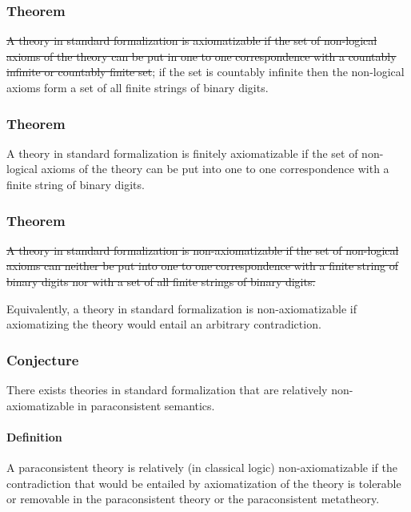 \hypertarget{theorem-9}{%
\subsubsection{Theorem}\label{theorem-9}}

\st{A theory in standard formalization is axiomatizable if the set of
non-logical axioms of the theory can be put in one to one correspondence
with a countably infinite or countably finite set}; if the set is
countably infinite then the non-logical axioms form a set of all finite
strings of binary digits.

\hypertarget{theorem-10}{%
\subsubsection{Theorem}\label{theorem-10}}

A theory in standard formalization is finitely axiomatizable if the set
of non-logical axioms of the theory can be put into one to one
correspondence with a finite string of binary digits.

\hypertarget{theorem-11}{%
\subsubsection{Theorem}\label{theorem-11}}

\st{A theory in standard formalization is non-axiomatizable if the set
of non-logical axioms can neither be put into one to one correspondence
with a finite string of binary digits nor with a set of all finite
strings of binary digits.}

Equivalently, a theory in standard formalization is non-axiomatizable if
axiomatizing the theory would entail an arbitrary contradiction.

\hypertarget{conjecture-2}{%
\subsubsection{Conjecture}\label{conjecture-2}}

There exists theories in standard formalization that are relatively
non-axiomatizable in paraconsistent semantics.

\hypertarget{definition-5}{%
\paragraph{Definition}\label{definition-5}}

A paraconsistent theory is relatively (in classical logic)
non-axiomatizable if the contradiction that would be entailed by
axiomatization of the theory is tolerable or removable in the
paraconsistent theory or the paraconsistent metatheory.

